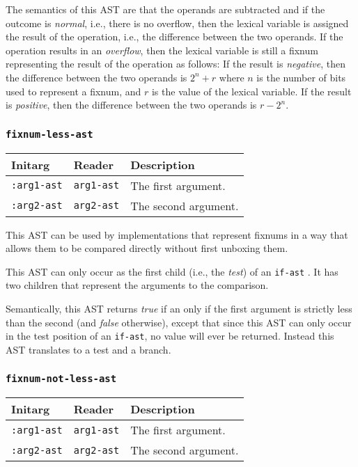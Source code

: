 The semantics of this AST are that the operands are subtracted and if
the outcome is \emph{normal}, i.e., there is no overflow, then the
lexical variable is assigned the result of the operation, i.e., the
difference between the two operands.  If the operation results in an
\emph{overflow}, then the lexical variable is still a fixnum
representing the result of the operation as follows: If the result is
\emph{negative}, then the difference between the two operands is $2^n
+ r$ where $n$ is the number of bits used to represent a fixnum, and
$r$ is the value of the lexical variable.  If the result is
\emph{positive}, then the difference between the two operands is $r -
2^n$.

\subsubsection{\texttt{fixnum-less-ast}}
\label{fixnum-less-ast}

\begin{tabular}{|l|l|l|}
\hline
Initarg & Reader & Description\\
\hline\hline
\texttt{:arg1-ast} & \texttt{arg1-ast} & The first argument.\\
\hline
\texttt{:arg2-ast} & \texttt{arg2-ast} & The second argument.\\
\hline
\end{tabular}

This AST can be used by implementations that represent fixnums in a
way that allows them to be compared directly without first unboxing
them.

This AST can only occur as the first child (i.e., the \emph{test}) of
an \texttt{if-ast} .  It has two children that
represent the arguments to the comparison.

Semantically, this AST returns \emph{true} if an only if the first
argument is strictly less than the second (and \emph{false}
otherwise), except that since this AST can only occur in the test
position of an \texttt{if-ast}, no value will ever be returned.
Instead this AST translates to a test and a branch.

\subsubsection{\texttt{fixnum-not-less-ast}}
\label{fixnum-not-less-ast}

\begin{tabular}{|l|l|l|}
\hline
Initarg & Reader & Description\\
\hline\hline
\texttt{:arg1-ast} & \texttt{arg1-ast} & The first argument.\\
\hline
\texttt{:arg2-ast} & \texttt{arg2-ast} & The second argument.\\
\hline
\end{tabular}

